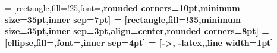  = [rectangle,fill=\mauphu!25,font=\bfseries\sffamily\LARGE\color{\mycolor!40!black},rounded corners=10pt,minimum size=35pt,inner sep=7pt]
 = [rectangle,fill=\mycolor!35,minimum size=35pt,inner sep=3pt,align=center,rounded corners=8pt]
 = [ellipse,fill=\maudam,font=\bfseries\sffamily\LARGE\color{\mauphu!10!white},inner sep=4pt]
 = [->, -latex,\maudam,line width=1pt]